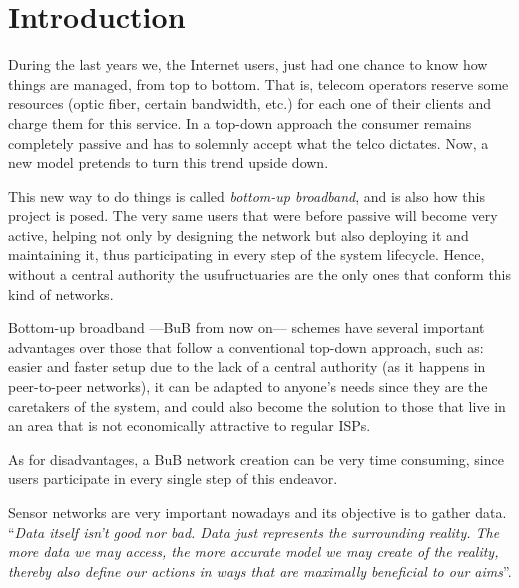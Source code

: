 
\chapter{Introduction} %

\label{Chapter1} %



During the last years we, the Internet users, just had one chance to know how things are managed, from top to bottom. That is, telecom operators reserve some resources (optic fiber, certain bandwidth, etc.) for each one of their clients and charge them for this service. In a top-down approach the consumer remains completely passive and has to solemnly accept what the telco dictates. Now, a new model pretends to turn this trend upside down.

This new way to do things is called \emph{bottom-up broadband}, and is also how this project is posed. The very same users that were before passive will become very active, helping not only by designing the network but also deploying it and maintaining it, thus participating in every step of the system lifecycle. Hence, without a central authority the usufructuaries are the only ones that conform this kind of networks.

Bottom-up broadband ---BuB from now on--- schemes have several important advantages over those that follow a conventional top-down approach, such as: easier and faster setup due to the lack of a central authority (as it happens in peer-to-peer networks), it can be adapted to anyone's needs since they are the caretakers of the system, and could also become the solution to those that live in an area that is not economically attractive to regular ISPs\citep{oliver2010wireless}.

As for disadvantages, a BuB network creation can be very time consuming, since users participate in every single step of this endeavor\citep{barcelobottom}. %

Sensor networks are very important nowadays and its objective is to gather data. 
``\emph{Data itself isn't good nor bad. Data just represents the surrounding reality. The more data we may access, the more accurate model we may create of the reality, thereby also define our actions in ways that are maximally beneficial to our aims}''\citep{parazite}.

